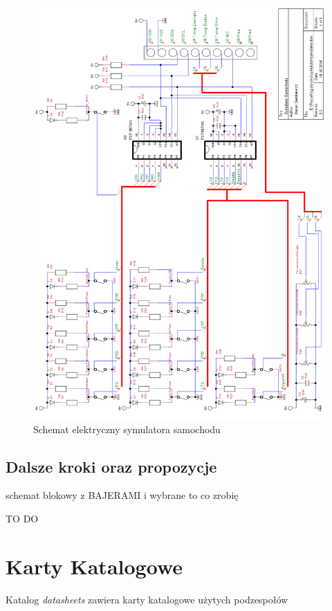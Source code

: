 \documentclass{xmgr}
\begin{document}

\begin{figure}[!p]
    \centering
    	\includegraphics[height=0.9\textheight]{images/symulator.png}
    \caption{Schemat elektryczny symulatora samochodu}
\end{figure}

\section{Dalsze kroki oraz propozycje}
schemat blokowy z BAJERAMI i wybrane to co zrobię

\summary
TO DO

\appendix
\chapter{Karty Katalogowe}
Katalog \emph{datasheets} zawiera karty katalogowe użytych podzespołów
\end{document}
